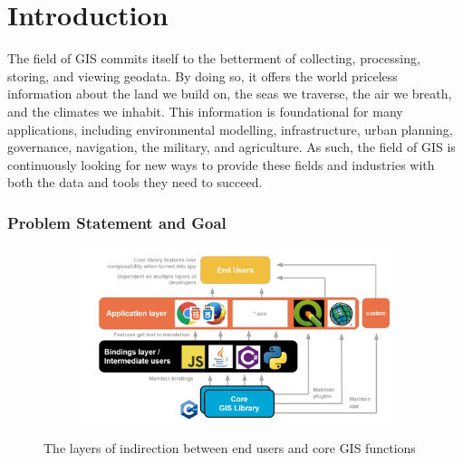 \chapter{Introduction}
\label{chap:intro}

\graphicspath{{../../assets/images/1/}}

The field of \ac{GIS} commits itself to the betterment of collecting, processing, storing, and viewing geodata. 
By doing so, it offers the world priceless information about the land we build on, the seas we traverse, the air we breath, and the climates we inhabit. 
This information is foundational for many applications, including environmental modelling, infrastructure, urban planning, governance, navigation, the military, and agriculture.   
As such, the field of \ac{GIS} is continuously looking for new ways to provide these fields and industries with both the data and tools they need to succeed. 

\subsection*{Problem Statement and Goal}

\begin{figure}
  \centering
  \begin{subfigure}[b]{\linewidth}
    \includegraphics[width=\linewidth]{layers.png}
  \end{subfigure}%
  \caption{The layers of indirection between end users and core GIS functions}
  \label{fig:problem-statement}
\end{figure}

